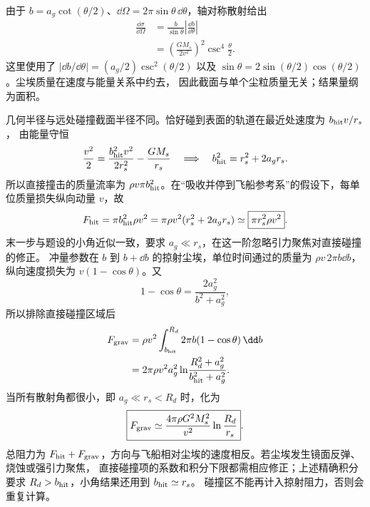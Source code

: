 \begin{xesolution}
由于 $b=a_g\cot(\theta/2)$、$\dd\Omega=2\pi\sin\theta\,\dd\theta$，轴对称散射给出
\begin{align*}
 \frac{\dd\sigma}{\dd\Omega}
 &=\frac{b}{\sin\theta}\left|\frac{\dd b}{\dd\theta}\right|\\
 &=\boxed{\left(\frac{GM_s}{2v^2}\right)^2
 \csc^4\frac\theta2}.
\end{align*}
这里使用了 $|\dd b/\dd\theta|=(a_g/2)\csc^2(\theta/2)$ 以及
$\sin\theta=2\sin(\theta/2)\cos(\theta/2)$。尘埃质量在速度与能量关系中约去，
因此截面与单个尘粒质量无关；结果量纲为面积。

几何半径与远处碰撞截面半径不同。恰好碰到表面的轨道在最近处速度为 $b_{\rm hit}v/r_s$，
由能量守恒
\[
 \frac{v^2}{2}=\frac{b_{\rm hit}^2v^2}{2r_s^2}-\frac{GM_s}{r_s}
 \quad\Longrightarrow\quad b_{\rm hit}^2=r_s^2+2a_gr_s.
\]
所以直接撞击的质量流率为 $\rho v\pi b_{\rm hit}^2$。在“吸收并停到飞船参考系”的假设下，每单位质量损失纵向动量 $v$，故
\[
 F_{\rm hit}=\pi b_{\rm hit}^2\rho v^2
 =\pi\rho v^2(r_s^2+2a_gr_s)\simeq\boxed{\pi r_s^2\rho v^2}.
\]
末一步与题设的小角近似一致，要求 $a_g\ll r_s$，在这一阶忽略引力聚焦对直接碰撞的修正。
冲量参数在 $b$ 到 $b+\dd b$ 的掠射尘埃，单位时间通过的质量为
$\rho v\,2\pi b\dd b$，纵向速度损失为 $v(1-\cos\theta)$。又
\[
 1-\cos\theta=\frac{2a_g^2}{b^2+a_g^2},
\]
所以排除直接碰撞区域后
\begin{align*}
 F_{\rm grav}
 &=\rho v^2\int_{b_{\rm hit}}^{R_d}2\pi b(1-\cos\theta)\,\dd b\\
 &=2\pi\rho v^2a_g^2
 \ln\!\frac{R_d^2+a_g^2}{b_{\rm hit}^2+a_g^2}.
\end{align*}
当所有散射角都很小，即 $a_g\ll r_s<R_d$ 时，化为
\[
 \boxed{F_{\rm grav}\simeq
 \frac{4\pi\rho G^2M_s^2}{v^2}\ln\frac{R_d}{r_s}}.
\]
总阻力为 $F_{\rm hit}+F_{\rm grav}$，方向与飞船相对尘埃的速度相反。若尘埃发生镜面反弹、烧蚀或强引力聚焦，
直接碰撞项的系数和积分下限都需相应修正；上述精确积分要求 $R_d>b_{\rm hit}$，小角结果还用到 $b_{\rm hit}\simeq r_s$。
碰撞区不能再计入掠射阻力，否则会重复计算。
\end{xesolution}

